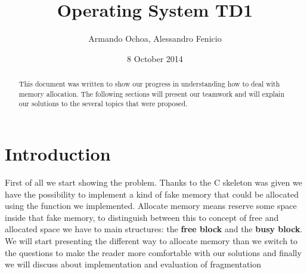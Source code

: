 \documentclass[11pt]{article}
\title{Operating System TD1}
\author
{Armando Ochoa, Alessandro Fenicio}
\date{8 October 2014}
\begin{document}
 




\maketitle 



\begin{abstract}
This document was written to show our progress in understanding how to deal with memory allocation. The following sections will present our teamwork and will explain our solutions to the several topics that were proposed.
\end{abstract}


\section{Introduction}
First of all we start showing the problem. Thanks to the C skeleton was given we have the possibility to implement a kind of fake memory that could be allocated using the function we implemented. Allocate memory means reserve some space inside that fake memory, to distinguish between this to concept of free and allocated space we have to main structures: the \textbf{free block} and the \textbf{busy block}. We will start presenting the different way to allocate memory than we switch to the questions to make the reader more comfortable with our solutions and finally we will discuss about implementation and evaluation of fragmentation
\end{document}
